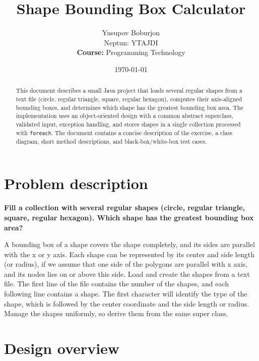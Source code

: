 \documentclass[a4paper,12pt]{article}
\title{Shape Bounding Box Calculator}
\author{Yusupov Boburjon \\ Neptun: YTAJDI \\ \textbf{Course:} Programming Technology}
\date{\today}
\begin{document}
\maketitle

\begin{abstract}
This document describes a small Java project that loads several regular shapes from a text file (circle, regular triangle, square, regular hexagon), computes their axis-aligned bounding boxes, and determines which shape has the greatest bounding box area. The implementation uses an object-oriented design with a common abstract superclass, validated input, exception handling, and stores shapes in a single collection processed with \texttt{foreach}. The document contains a concise description of the exercise, a class diagram, short method descriptions, and black-box/white-box test cases.
\end{abstract}

\section{Problem description}
\textbf{Fill a collection with several regular shapes (circle, regular triangle, square, regular hexagon). Which shape has the greatest bounding box area?}

A bounding box of a shape covers the shape completely, and its sides are parallel with the x or y axis. Each shape can be represented by its center and side length (or radius), if we assume that one side of the polygons are parallel with x axis, and its nodes lies on or above this side. Load and create the shapes from a text file. The first line of the file contains the number of the shapes, and each following line contains a shape. The first character will identify the type of the shape, which is followed by the center coordinate and the side length or radius. Manage the shapes uniformly, so derive them from the same super class.

\section{Design overview}
\end{document}
